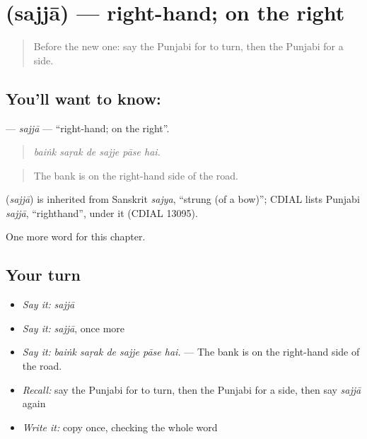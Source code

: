 \section[\texorpdfstring{\pa{ਸੱਜਾ} (sajjā)}{ਸੱਜਾ (sajjā)}]{ (sajjā) — right-hand; on the right}

\label{lesson:PA-C263-sajja}



\begin{quote}
Before the new one: say the Punjabi for to turn, then the Punjabi for a side.
\end{quote}

\subsection*{You'll want to know: }
\textbf{} — \emph{sajjā} — \textquotedblleft{}right-hand; on the right\textquotedblright{}.

\begin{quote}
     
\end{quote}

\begin{quote}
\emph{baiṅk saṛak de sajje pāse hai.}
\end{quote}

\begin{quote}
The bank is on the right-hand side of the road.
\end{quote}

\begin{cousinweb}
\textbf{} (\emph{sajjā}) is inherited from Sanskrit \emph{sajya}, \textquotedblleft{}strung (of a bow)\textquotedblright{}; CDIAL lists Punjabi \emph{sajjā}, \textquotedblleft{}righthand\textquotedblright{}, under it (CDIAL 13095).
\end{cousinweb}

\begin{grammarlens}[title={What you've built}]
One more word for this chapter.
\end{grammarlens}

\subsection*{Your turn}
\begin{itemize}
\raggedright
  \item \emph{Say it:} \emph{sajjā}
  \item \emph{Say it:} \emph{sajjā}, once more
  \item \emph{Say it:} \emph{baiṅk saṛak de sajje pāse hai.} — The bank is on the right-hand side of the road.
  \item \emph{Recall:} say the Punjabi for to turn, then the Punjabi for a side, then say \emph{sajjā} again
  \item \emph{Write it:} copy \textbf{} once, checking the whole word
\end{itemize}

